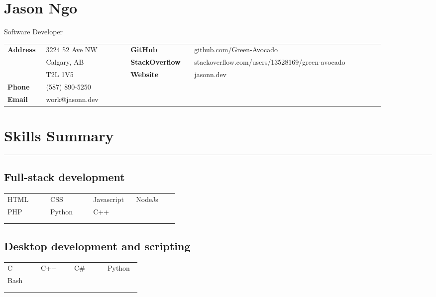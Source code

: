 \documentclass[letterpaper]{article}
\newcommand{\horizontalLine}{%
    \rule{\linewidth}{0.4pt}
    \vspace{1ex}
}
\begin{document}
    \section*{Jason Ngo}

    {\large
    Software Developer}

    {\small%
        \renewcommand{\arraystretch}{1.5}
        \begin{tabular}{p{0.08\linewidth} p{0.2\linewidth} p{0.15\linewidth} p{0.45\linewidth}}
            \\
            \textbf{Address} & 3224 52 Ave NW & \textbf{GitHub} & github.com/Green-Avocado \\
            & Calgary, AB & \textbf{StackOverflow} & stackoverflow.com/users/13528169/green-avocado \\
            & T2L 1V5 & \textbf{Website} & jasonn.dev \\
            \textbf{Phone} & (587) 890-5250 \\
            \textbf{Email} & work@jasonn.dev \\
        \end{tabular}
    }

    \section*{Skills Summary}

        \horizontalLine

        \subsection*{Full-stack development}

        \begin{tabular}{p{0.22\linewidth} p{0.22\linewidth} p{0.22\linewidth} p{0.22\linewidth}}
            \\
            HTML & CSS & Javascript & NodeJs \\
            PHP & Python & C++ \\
            \\
            \\
        \end{tabular}

        \subsection*{Desktop development and scripting}

        \begin{tabular}{p{0.22\linewidth} p{0.22\linewidth} p{0.22\linewidth} p{0.22\linewidth}}
            \\
            C & C++ & C\# & Python \\
            Bash \\
            \\
            \\
        \end{tabular}
\end{document}
